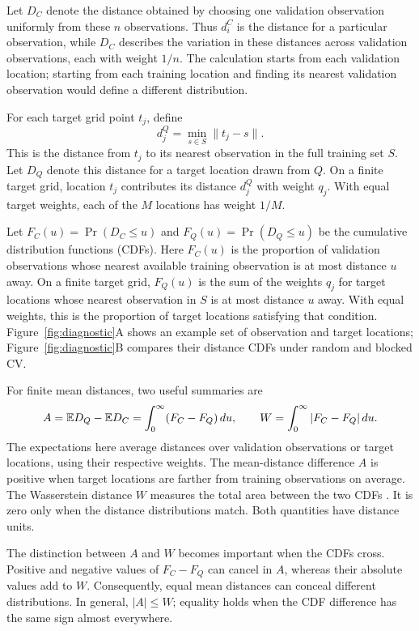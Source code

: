 Let $D_C$ denote the distance obtained by choosing one validation observation uniformly from these $n$ observations. Thus $d_i^C$ is the distance for a particular observation, while $D_C$ describes the variation in these distances across validation observations, each with weight $1/n$. The calculation starts from each validation location; starting from each training location and finding its nearest validation observation would define a different distribution.

For each target grid point $t_j$, define
\[
 d_j^Q=\min_{s\in S}\|t_j-s\|.
\]
This is the distance from $t_j$ to its nearest observation in the full training set $S$. Let $D_Q$ denote this distance for a target location drawn from $Q$. On a finite target grid, location $t_j$ contributes its distance $d_j^Q$ with weight $q_j$. With equal target weights, each of the $M$ locations has weight $1/M$.

Let $F_C(u)=\Pr(D_C\leq u)$ and $F_Q(u)=\Pr(D_Q\leq u)$ be the cumulative distribution functions (CDFs). Here $F_C(u)$ is the proportion of validation observations whose nearest available training observation is at most distance $u$ away. On a finite target grid, $F_Q(u)$ is the sum of the weights $q_j$ for target locations whose nearest observation in $S$ is at most distance $u$ away. With equal weights, this is the proportion of target locations satisfying that condition. Figure~\ref{fig:diagnostic}A shows an example set of observation and target locations; Figure~\ref{fig:diagnostic}B compares their distance CDFs under random and blocked CV.

For finite mean distances, two useful summaries are
\begin{equation}
 A=\mathbb{E} D_Q-\mathbb{E} D_C=\int_0^\infty(F_C-F_Q)\,du,\qquad
 W=\int_0^\infty|F_C-F_Q|\,du.\label{eq:geometry}
\end{equation}
The expectations here average distances over validation observations or target locations, using their respective weights. The mean-distance difference $A$ is positive when target locations are farther from training observations on average. The Wasserstein distance $W$ measures the total area between the two CDFs \citep{panaretos2019wasserstein}. It is zero only when the distance distributions match. Both quantities have distance units.

The distinction between $A$ and $W$ becomes important when the CDFs cross. Positive and negative values of $F_C-F_Q$ can cancel in $A$, whereas their absolute values add to $W$. Consequently, equal mean distances can conceal different distributions. In general, $|A|\leq W$; equality holds when the CDF difference has the same sign almost everywhere.

